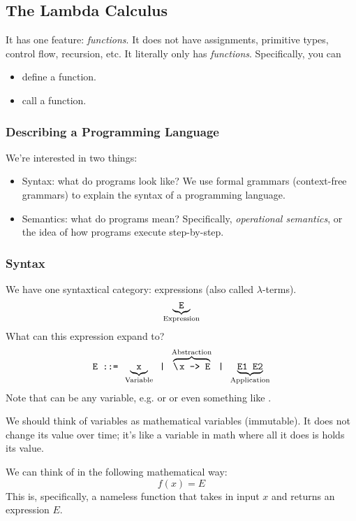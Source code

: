 \documentclass[letterpaper]{article}
\newcommand{\bsttt}[1]{\string\ \hspace{-4pt}#1{}}
\begin{document}
\subsection{The Lambda Calculus}
It has one feature: \emph{functions}. It does not have assignments, primitive types, control flow, recursion, etc. It literally only has \emph{functions}. Specifically, you can
\begin{itemize}
    \item define a function. 
    \item call a function. 
\end{itemize}

\subsubsection{Describing a Programming Language}
We're interested in two things: 
\begin{itemize}
    \item Syntax: what do programs look like? We use formal grammars (context-free grammars) to explain the syntax of a programming language.
    \item Semantics: what do programs mean? Specifically, \emph{operational semantics}, or the idea of how programs execute step-by-step. 
\end{itemize}

\subsubsection{Syntax}
We have one syntaxtical category: expressions (also called $\lambda$-terms).
\[\underbrace{\texttt{E}}_{\text{Expression}}\]
What can this expression expand to? 
\[\code{E ::= } \underbrace{\code{x}}_{\text{Variable}} \code{ | } \overbrace{\code{\bsttt{x} -> E}}^{\text{Abstraction}} \code{ | } \underbrace{\code{E1 E2}}_{\text{Application}}\]
Note that  can be any variable, e.g.  or  or even something like . 

\bigskip 

We should think of variables as mathematical variables (immutable). It does not change its value over time; it's like a variable in math where all it does is holds its value. 

\bigskip 

We can think of  in the following mathematical way: 
\[f(x) = E\]
This is, specifically, a nameless function that takes in input $x$ and returns an expression $E$. 
\end{document}
